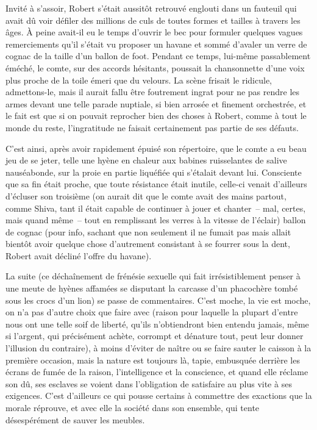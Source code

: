 Invité à s’assoir, Robert s’était aussitôt retrouvé englouti dans un fauteuil qui avait dû voir défiler des millions de culs de toutes formes et tailles à travers les âges. À peine avait-il eu le temps d’ouvrir le bec pour formuler quelques vagues remerciements qu’il s’était vu proposer un havane et sommé d’avaler un verre de cognac de la taille d’un ballon de foot. Pendant ce temps, lui-même passablement éméché, le comte, sur des accords hésitants, poussait la chansonnette d’une voix plus proche de la toile émeri que du velours. La scène frisait le ridicule, admettons-le, mais il aurait fallu être foutrement ingrat pour ne pas rendre les armes devant une telle parade nuptiale, si bien arrosée et finement orchestrée, et le fait est que si on pouvait reprocher bien des choses à Robert, comme à tout le monde du reste, l’ingratitude ne faisait certainement pas partie de ses défauts.

\illusloflabel{}%
%
C’est ainsi, après avoir rapidement épuisé son répertoire, que le comte a eu beau jeu de se jeter, telle une hyène en chaleur aux babines ruisselantes de salive nauséabonde, sur la proie en partie liquéfiée qui s’étalait devant lui. Consciente que sa fin était proche, que toute résistance était inutile, celle-ci venait d’ailleurs d’écluser son troisième (on aurait dit que le comte avait des mains partout, comme Shiva, tant il était capable de continuer à jouer et chanter~-- mal, certes, mais quand même~-- tout en remplissant les verres à la vitesse de l’éclair) ballon de cognac (pour info, sachant que non seulement il ne fumait pas mais allait bientôt avoir quelque chose d’autrement consistant à se fourrer sous la dent, Robert avait décliné l’offre du havane).

La suite (ce déchaînement de frénésie sexuelle qui fait irrésistiblement penser à une meute de hyènes affamées se disputant la carcasse d’un phacochère tombé sous les crocs d’un lion) se passe de commentaires. C’est moche, la vie est moche, on n’a pas d’autre choix que faire avec (raison pour laquelle la plupart d’entre nous ont une telle soif de liberté, qu’ils n’obtiendront bien entendu jamais, même si l’argent, qui précisément achète, corrompt et dénature tout, peut leur donner l’illusion du contraire), à moins d’éviter de naître ou se faire sauter le caisson à la première occasion, mais la nature est toujours là, tapie, embusquée derrière les écrans de fumée de la raison, l’intelligence et la conscience, et quand elle réclame son dû, ses esclaves se voient dans l’obligation de satisfaire au plus vite à ses exigences. C’est d’ailleurs ce qui pousse certains à commettre des exactions que la morale réprouve, et avec elle la société dans son ensemble, qui tente désespérément de sauver les meubles.

